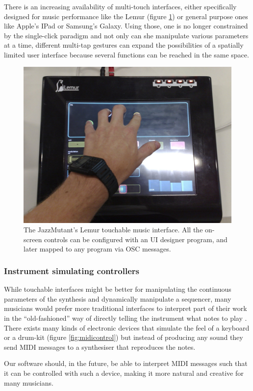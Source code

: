 There is an increasing availability of multi-touch
interfaces, either specifically designed
for music performance like the Lemur (figure \ref{fig:lemur}) or
general purpose ones like Apple's IPad or Samsung's Galaxy. Using
those, one is no longer constrained by the single-click paradigm and
not only can she manipulate various parameters at a time, different
multi-tap gestures can expand the possibilities of a spatially limited
user interface because several functions can be reached in the same
space.

\begin{figure}[h!]
\centering
\includegraphics[width=.6\textwidth]{pic/lemur.jpg}
\caption[The JazzMutant's Lemur touchable music interface.]{The
  JazzMutant's Lemur touchable music interface. All the on-screen
  controls can be configured with an UI designer program, and later
  mapped to any program via OSC messages.}
\label{fig:lemur}
\end{figure}

\subsubsection{Instrument simulating controllers}

While touchable interfaces might be better for
manipulating the continuous parameters of the synthesis and
dynamically manipulate a sequencer, many musicians would prefer more
traditional interfaces to interpret part of their work in the
``old-fashioned'' way of directly telling the instrument what notes to
play \cite{magnusson07acoustic}. There exists many kinds of electronic
devices that simulate the feel of a keyboard or a drum-kit (figure
\ref{fig:midicontrol}) but instead of producing any sound they send
MIDI
\cite{completemidi} messages to a synthesiser that reproduces the
notes.

Our software should, in the future, be able to interpret MIDI messages
such that it can be controlled with such a device, making it more
natural and creative for many musicians.

